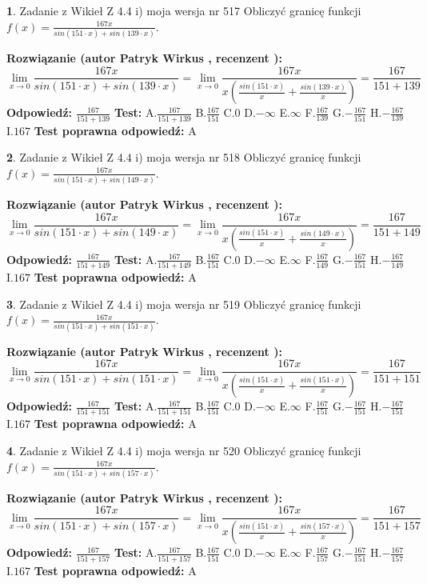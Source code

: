 \documentclass[12pt, a4paper]{article}
\theoremstyle{definition} %
\newtheorem{zad}{}
\newcommand{\zadStart}[1]{\begin{zad}#1\newline}
\newcommand{\zadStop}{\end{zad}}
\newcommand{\rozwStart}[2]{\noindent \textbf{Rozwiązanie (autor #1 , recenzent #2): }\newline}
\newcommand{\rozwStop}{\newline}
\newcommand{\odpStart}{\noindent \textbf{Odpowiedź:}\newline}
\newcommand{\odpStop}{\newline}
\newcommand{\testStart}{\noindent \textbf{Test:}\newline}
\newcommand{\testStop}{\newline}
\newcommand{\kluczStart}{\noindent \textbf{Test poprawna odpowiedź:}\newline}
\newcommand{\kluczStop}{\newline}
\begin{document}
\zadStart{Zadanie z Wikieł Z 4.4 i) moja wersja nr 517}
Obliczyć granicę funkcji $f(x)=\frac{167x}{sin(151\cdot x) +sin(139\cdot x)}$.
\zadStop
\rozwStart{Patryk Wirkus}{}
$$\lim\limits_{x\to 0}\frac{167x}{sin(151\cdot x) +sin(139\cdot x)}=\lim\limits_{x\to 0}\frac{167x}{x(\frac{sin(151\cdot x)}{x}+\frac{sin(139\cdot x)}{x})}=\frac{167}{151+139}$$
\rozwStop
\odpStart
$\frac{167}{151+139}$
\odpStop
\testStart
A.$\frac{167}{151+139}$
B.$\frac{167}{151}$
C.$0$
D.$-\infty$
E.$\infty$
F.$\frac{167}{139}$
G.$-\frac{167}{151}$
H.$-\frac{167}{139}$
I.$167$
\testStop
\kluczStart
A
\kluczStop



\zadStart{Zadanie z Wikieł Z 4.4 i) moja wersja nr 518}
Obliczyć granicę funkcji $f(x)=\frac{167x}{sin(151\cdot x) +sin(149\cdot x)}$.
\zadStop
\rozwStart{Patryk Wirkus}{}
$$\lim\limits_{x\to 0}\frac{167x}{sin(151\cdot x) +sin(149\cdot x)}=\lim\limits_{x\to 0}\frac{167x}{x(\frac{sin(151\cdot x)}{x}+\frac{sin(149\cdot x)}{x})}=\frac{167}{151+149}$$
\rozwStop
\odpStart
$\frac{167}{151+149}$
\odpStop
\testStart
A.$\frac{167}{151+149}$
B.$\frac{167}{151}$
C.$0$
D.$-\infty$
E.$\infty$
F.$\frac{167}{149}$
G.$-\frac{167}{151}$
H.$-\frac{167}{149}$
I.$167$
\testStop
\kluczStart
A
\kluczStop



\zadStart{Zadanie z Wikieł Z 4.4 i) moja wersja nr 519}
Obliczyć granicę funkcji $f(x)=\frac{167x}{sin(151\cdot x) +sin(151\cdot x)}$.
\zadStop
\rozwStart{Patryk Wirkus}{}
$$\lim\limits_{x\to 0}\frac{167x}{sin(151\cdot x) +sin(151\cdot x)}=\lim\limits_{x\to 0}\frac{167x}{x(\frac{sin(151\cdot x)}{x}+\frac{sin(151\cdot x)}{x})}=\frac{167}{151+151}$$
\rozwStop
\odpStart
$\frac{167}{151+151}$
\odpStop
\testStart
A.$\frac{167}{151+151}$
B.$\frac{167}{151}$
C.$0$
D.$-\infty$
E.$\infty$
F.$\frac{167}{151}$
G.$-\frac{167}{151}$
H.$-\frac{167}{151}$
I.$167$
\testStop
\kluczStart
A
\kluczStop



\zadStart{Zadanie z Wikieł Z 4.4 i) moja wersja nr 520}
Obliczyć granicę funkcji $f(x)=\frac{167x}{sin(151\cdot x) +sin(157\cdot x)}$.
\zadStop
\rozwStart{Patryk Wirkus}{}
$$\lim\limits_{x\to 0}\frac{167x}{sin(151\cdot x) +sin(157\cdot x)}=\lim\limits_{x\to 0}\frac{167x}{x(\frac{sin(151\cdot x)}{x}+\frac{sin(157\cdot x)}{x})}=\frac{167}{151+157}$$
\rozwStop
\odpStart
$\frac{167}{151+157}$
\odpStop
\testStart
A.$\frac{167}{151+157}$
B.$\frac{167}{151}$
C.$0$
D.$-\infty$
E.$\infty$
F.$\frac{167}{157}$
G.$-\frac{167}{151}$
H.$-\frac{167}{157}$
I.$167$
\testStop
\kluczStart
A
\kluczStop
\end{document}
